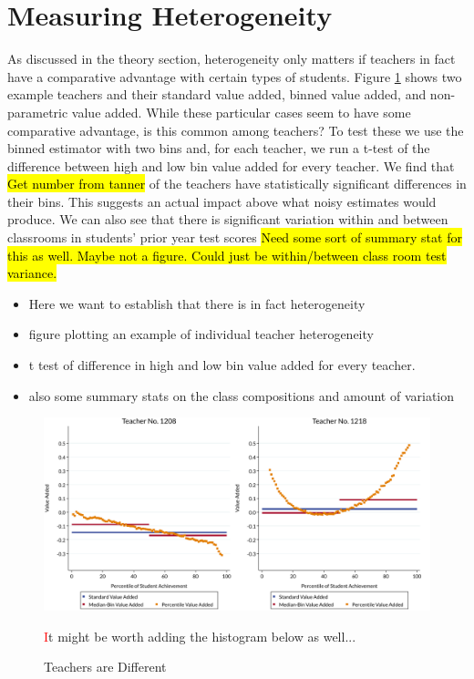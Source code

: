 \documentclass{article}
\theoremstyle{definition}
\theoremstyle{definition}
\theoremstyle{definition}
\theoremstyle{definition}
\begin{document}
\section{Measuring Heterogeneity} \label{hetva}

    As discussed in the theory section, heterogeneity only matters if teachers in fact have a comparative advantage with certain types of students. Figure \ref{fig_teacher_examples}  shows two example teachers and their standard value added, binned value added, and non-parametric value added. While these particular cases seem to have some comparative advantage, is this common among teachers? To test these we use the binned estimator with two bins and, for each teacher, we run a t-test of the difference between high and low bin value added for every teacher. We find that \hl{Get number from tanner} of the teachers have statistically significant differences in their bins. This suggests an actual impact above what noisy estimates would produce. We can also see that there is significant variation within and between classrooms in students' prior year test scores \hl{Need some sort of summary stat for this as well. Maybe not a figure. Could just be within/between class room test variance.}
  
  \begin{itemize}
      \item Here we want to establish that there is in fact heterogeneity 
      \item figure plotting an example of individual teacher heterogeneity 
      \item t test of difference in high and low bin value added for every teacher. 
      \item also some summary stats on the class compositions and amount of variation 
  \end{itemize}  
    
    \begin{figure}
        \begin{center}
        \includegraphics[width=.85\textwidth]{slides/slides_pffls/fig1_heterogeneity.pdf}
        \end{center}
            \caption{Teachers are Different}
            \label{fig_teacher_examples}
            \textcolor{red}It might be worth adding the histogram below as well... 
    \end{figure}
    
\end{document}
